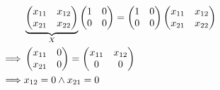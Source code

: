 \begin{itemize}
\begin{enumerate}[label=\alph*)]
\begin{itemize}
                        \begin{align*}
                            & \underbrace{%
                            \begin{pmatrix}
                                x_{11} & x_{12} \\
                                x_{21} & x_{22}
                            \end{pmatrix}}_{X} 
                            \begin{pmatrix}
                                1 & 0 \\
                                0 & 0
                            \end{pmatrix}
                            =
                            \begin{pmatrix}
                                1 & 0 \\
                                0 & 0
                            \end{pmatrix}
                            \begin{pmatrix}
                                x_{11} & x_{12} \\
                                x_{21} & x_{22}
                            \end{pmatrix} \\
                            \implies &
                            \begin{pmatrix}
                                x_{11} & 0 \\
                                x_{21} & 0
                            \end{pmatrix}
                            =
                            \begin{pmatrix}
                                x_{11} & x_{12} \\
                                0 & 0
                            \end{pmatrix} \\
                            \implies& x_{12} = 0 \wedge x_{21}= 0 \\
                        \end{align*}


\end{itemize}
\end{enumerate}
\end{itemize}
